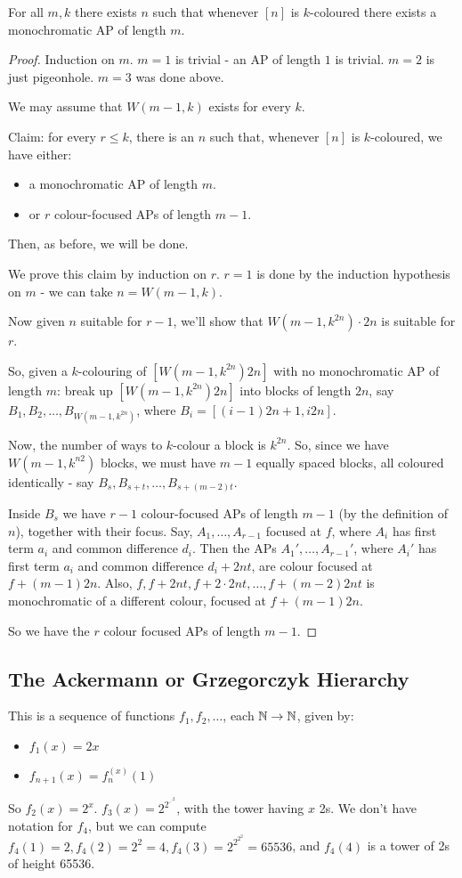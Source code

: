 \documentclass[10pt,a4paper]{article}
\begin{document}
\begin{theorem}
  For all $m, k$ there exists $n$ such that whenever $[n]$ is $k$-coloured there exists a monochromatic AP of length $m$.
\end{theorem}
\begin{proof}
  Induction on $m$. $m=1$ is trivial - an AP of length $1$ is trivial. $m=2$ is just pigeonhole. $m=3$ was done above.

  We may assume that $W(m-1, k)$ exists for every $k$.

  Claim: for every $r \leq k$, there is an $n$ such that, whenever $[n]$ is $k$-coloured, we have either:
  \begin{itemize}
    \item a monochromatic AP of length $m$.
    \item or $r$ colour-focused APs of length $m-1$.
  \end{itemize}
  Then, as before, we will be done.

  We prove this claim by induction on $r$. $r=1$ is done by the induction hypothesis on $m$ -  we can take $n= W(m-1, k)$.

  Now given $n$ suitable for $r-1$, we'll show that $W(m-1, k^{2n})\cdot 2n$ is suitable for $r$.

  So, given a $k$-colouring of $[W(m-1, k^{2n})2n]$ with no monochromatic AP of length $m$: break up $[W(m-1, k^{2n})2n]$ into blocks of length $2n$, say $B_1, B_2, \ldots, B_{W(m-1, k^{2n})}$, where $B_i = [(i-1)2n + 1, i2n]$.

  Now, the number of ways to $k$-colour a block is $k^{2n}$. So, since we have $W(m-1, k^{n2})$ blocks, we must have $m-1$ equally spaced blocks, all coloured identically - say $B_s, B_{s+t}, \ldots, B_{s+(m-2)t}$.

  Inside $B_s$ we have $r-1$ colour-focused APs of length $m-1$ (by the definition of $n$), together with their focus. Say, $A_1, \ldots, A_{r-1}$ focused at $f$, where $A_i$ has first term $a_i$ and common difference $d_i$. Then the APs $A_1', \ldots, A_{r-1}'$, where $A_i'$ has first term $a_i$ and common difference $d_i + 2nt$, are colour focused at $f+(m-1)2n$. Also, $f, f +2nt, f+2\cdot 2nt, \ldots, f+(m-2)2nt$ is monochromatic of a different colour, focused at $f+(m-1)2n$.

  So we have the $r$ colour focused APs of length $m-1$.
\end{proof}
\subsection{The Ackermann or Grzegorczyk Hierarchy}
This is a sequence of functions $f_1, f_2, \ldots$, each $\mathbb{N} \to \mathbb{N}$, given by:
\begin{itemize}
  \item $f_1(x) = 2x$
  \item $f_{n+1}(x) = f_n^{(x)}(1)$
\end{itemize}
So $f_2(x) = 2^x$. $f_3(x) = 2^{2^{\iddots^2}}$, with the tower having $x$ 2s. We don't have notation for $f_4$, but we can compute $f_4(1) = 2, f_4(2) = 2^2 = 4, f_4(3) = 2^{2^{2^2}} = 65536$, and $f_4(4)$ is a tower of 2s of height 65536.
\end{document}

